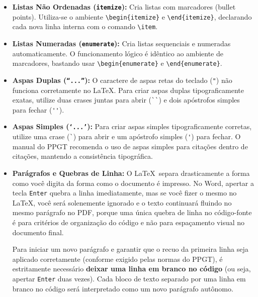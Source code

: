\documentclass[a4paper,12pt]{article}
\begin{document}
\begin{itemize}
    \begin{atencao}
    Atenção ao rigor do PPGT: o manual especifica que palavras que se desejam dar destaque devem ser escritas entre aspas duplas ou com as iniciais em maiúsculo, e não com o negrito, que é reservado estritamente para títulos de seções, numeração de ilustrações e elementos estruturais.
    \end{atencao}

    \item \textbf{Listas Não Ordenadas (\texttt{itemize}):} Cria listas com marcadores (bullet points). Utiliza-se o ambiente \texttt{\textbackslash begin\{itemize\}} e \texttt{\textbackslash end\{itemize\}}, declarando cada nova linha interna com o comando \texttt{\textbackslash item}.
    \item \textbf{Listas Numeradas (\texttt{enumerate}):} Cria listas sequenciais e numeradas automaticamente. O funcionamento lógico é idêntico ao ambiente de marcadores, bastando usar \texttt{\textbackslash begin\{enumerate\}} e \texttt{\textbackslash end\{enumerate\}}.
    \item \textbf{Aspas Duplas (\texttt{``...''}):} O caractere de aspas retas do teclado (\verb|"|) não funciona corretamente no LaTeX. Para criar aspas duplas tipograficamente exatas, utilize duas crases juntas para abrir (\verb|``|) e dois apóstrofos simples para fechar (\verb|''|).
    \item \textbf{Aspas Simples (\texttt{`...'}):} Para criar aspas simples tipograficamente corretas, utilize uma crase (\verb|`|) para abrir e um apóstrofo simples (\verb|'|) para fechar. O manual do PPGT recomenda o uso de aspas simples para citações dentro de citações, mantendo a consistência tipográfica.
    \item \textbf{Parágrafos e Quebras de Linha:} O \LaTeX \ separa drasticamente a forma como você digita da forma como o documento é impresso. No Word, apertar a tecla \texttt{Enter} quebra a linha imediatamente, mas se você fizer o mesmo no \LaTeX, você será solenemente ignorado e o texto continuará fluindo no mesmo parágrafo no PDF, porque uma única quebra de linha no código-fonte é para critérios de organização do código e não para espaçamento visual no documento final.

    Para iniciar um novo parágrafo e garantir que o recuo da primeira linha seja aplicado corretamente (conforme exigido pelas normas do PPGT), é estritamente necessário \textbf{deixar uma linha em branco no código} (ou seja, apertar \texttt{Enter} duas vezes). Cada bloco de texto separado por uma linha em branco no código será interpretado como um novo parágrafo autônomo.


\end{itemize}
\end{document}
